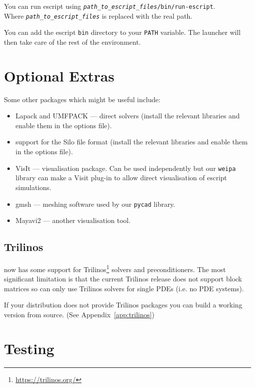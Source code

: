 You can run escript using \texttt{\textit{path_to_escript_files}/bin/run-escript}.\\
Where \texttt{\textit{path_to_escript_files}} is replaced with the real path.

\begin{optionalstep}
You can add the escript \texttt{bin} directory to your \texttt{PATH} variable.
The launcher will then take care of the rest of the environment.
\end{optionalstep}

\section{Optional Extras}

Some other packages which might be useful include:
\begin{itemize}
 \item Lapack and UMFPACK --- direct solvers (install the relevant libraries and enable them in the options file).
 \item support for the Silo file format (install the relevant libraries and enable them in the options file).
 \item VisIt --- visualisation package. Can be used independently but our \texttt{weipa} library can make a Visit
plug-in to allow direct visualisation of escript simulations.
 \item gmsh --- meshing software used by our \texttt{pycad} library.
 \item Mayavi2 --- another visualisation tool.
\end{itemize}


\subsection{Trilinos}
\escript now has some support for Trilinos\footnote{\url{https://trilinos.org/}}
solvers and preconditioners.
The most significant limitation is that the current Trilinos release does not
support block matrices so \escript can only use Trilinos solvers for single
PDEs (i.e. no PDE systems).

If your distribution does not provide Trilinos packages you can build a working
version from source. (See Appendix~\ref{app:trilinos})


\section{Testing \escript}\label{chap:utest}

